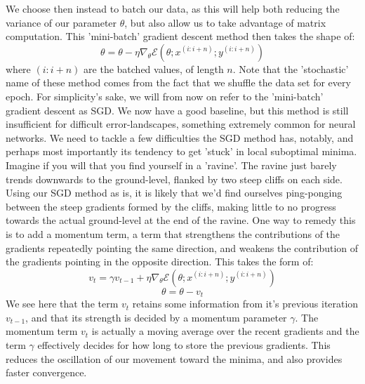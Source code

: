 \documentclass[12pt]{article}
\begin{document}
{\newline
We choose then instead to batch our data, as this will help both reducing the variance of our parameter $\theta$, but also allow us to take advantage of matrix computation. This 'mini-batch' gradient descent method then takes the shape of:
\begin{equation*}
    \theta = \theta - \eta \nabla_\theta \mathcal{E}(\theta; x^{(i:i+n)}; y^{(i:i+n)})
\end{equation*}
where $(i:i+n)$ are the batched values, of length $n$. Note that the 'stochastic' name of these method comes from the fact that we shuffle the data set for every epoch. For simplicity's sake, we will from now on refer to the 'mini-batch' gradient descent as SGD.
\newline
We now have a good baseline, but this method is still insufficient for difficult error-landscapes, something extremely common for neural networks. We need to tackle a few difficulties the SGD method has, notably, and perhaps most importantly its tendency to get 'stuck' in local suboptimal minima.
\newline
Imagine if you will that you find yourself in a 'ravine'. The ravine just barely trends downwards to the ground-level, flanked by two steep cliffs on each side. Using our SGD method as is, it is likely that we'd find ourselves ping-ponging between the steep gradients formed by the cliffs, making little to no progress towards the actual ground-level at the end of the ravine. One way to remedy this is to add a momentum term, a term that strengthens the contributions of the gradients repeatedly pointing the same direction, and weakens the contribution of the gradients pointing in the opposite direction. This takes the form of:
\begin{equation*}
    v_t = \gamma v_{t-1} + \eta \nabla_\theta \mathcal{E}(\theta; x^{(i:i+n)}; y^{(i:i+n)})
\end{equation*}
\begin{equation*}
    \theta = \theta - v_t
\end{equation*}
We see here that the term $v_t$ retains some information from it's previous iteration $v_{t-1}$, and that its strength is decided by a momentum parameter $\gamma$. The momentum term $v_t$ is actually a moving average over the recent gradients and the term $\gamma$ effectively decides for how long to store the previous gradients. This reduces the oscillation of our movement toward the minima, and also provides faster convergence.
\newline
}
\end{document}
